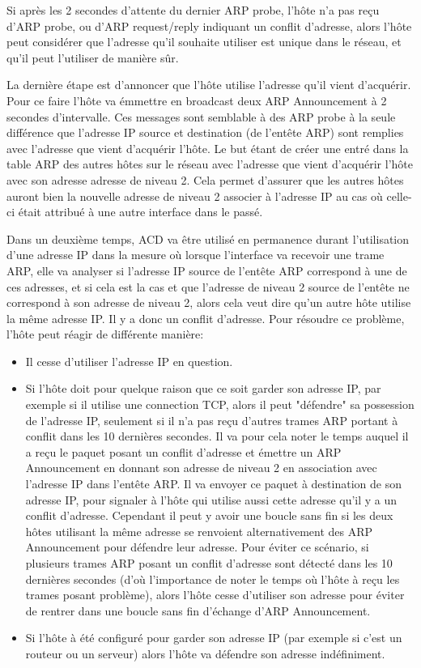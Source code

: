 \smallbreak
Si après les 2 secondes d'attente du dernier ARP probe, l'hôte n'a pas reçu
d'ARP probe, ou d'ARP request/reply indiquant un conflit d'adresse, alors
l'hôte peut considérer que l'adresse qu'il souhaite utiliser est unique dans le
réseau, et qu'il peut l'utiliser de manière sûr.

La dernière étape est d'annoncer que l'hôte utilise l'adresse qu'il vient
d'acquérir.  Pour ce faire l'hôte va émmettre en broadcast deux ARP
Announcement à 2 secondes d'intervalle.  Ces messages sont semblable à des ARP
probe à la seule différence que l'adresse IP source et destination (de l'entête
ARP) sont remplies avec l'adresse que vient d'acquérir l'hôte.  Le but étant de
créer une entré dans la table ARP des autres hôtes sur le réseau avec l'adresse
que vient d'acquérir l'hôte avec son adresse adresse de niveau 2. Cela permet
d'assurer que les autres hôtes auront bien la nouvelle adresse de niveau 2
associer à l'adresse IP au cas où celle-ci était attribué à une autre interface
dans le passé.

\smallbreak

Dans un deuxième temps, ACD va être utilisé en permanence durant l'utilisation
d'une adresse IP dans la mesure où lorsque l'interface va recevoir une
trame ARP, elle va analyser si l'adresse IP source de l'entête ARP correspond
à une de ces adresses, et si cela est la cas et que l'adresse de niveau 2
source de l'entête ne correspond à son adresse de niveau 2, alors cela veut
dire qu'un autre hôte utilise la même adresse IP. Il y a donc un conflit
d'adresse.  Pour résoudre ce problème, l'hôte peut réagir de différente
manière:
\begin{itemize}
\item Il cesse d'utiliser l'adresse IP en question.
\item Si l'hôte doit pour quelque raison que ce soit garder son adresse IP, par
exemple si il utilise une connection TCP, alors il peut "défendre" sa
possession de l'adresse IP, seulement si il n'a pas reçu d'autres trames ARP
portant à conflit dans les 10 dernières secondes.  Il va pour cela noter le
temps auquel il a reçu le paquet posant un conflit d'adresse et émettre un ARP
Announcement en donnant son adresse de niveau 2 en association avec l'adresse
IP dans l'entête ARP. Il va envoyer ce paquet à destination de son adresse IP,
pour signaler à l'hôte qui utilise aussi cette adresse qu'il y a un conflit
d'adresse. Cependant il peut y avoir une boucle sans fin si les deux hôtes
utilisant la même adresse se renvoient alternativement des ARP Announcement
pour défendre leur adresse. Pour éviter ce scénario, si plusieurs trames ARP
posant un conflit d'adresse sont détecté dans les 10 dernières secondes (d'où
l'importance de noter le temps où l'hôte à reçu les trames posant problème),
alors l'hôte cesse d'utiliser son adresse pour éviter de rentrer dans une
boucle sans fin d'échange d'ARP Announcement.
\item Si l'hôte à été configuré pour garder son adresse IP (par exemple si
c'est un routeur ou un serveur) alors l'hôte va défendre son adresse
indéfiniment.
\end{itemize}


